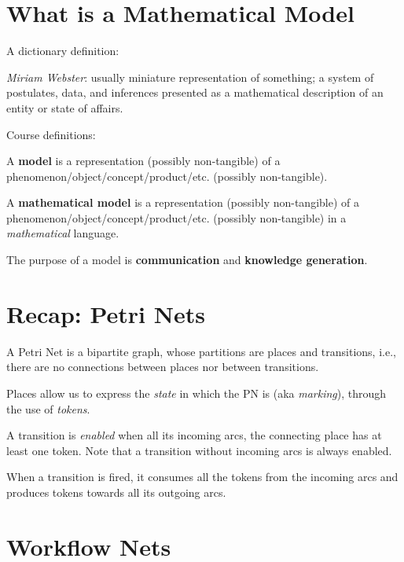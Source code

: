 
\section*{What is a Mathematical Model}

A dictionary definition:

\begin{definition}
	\emph{Miriam Webster}: usually miniature representation of something; a system of postulates, data, and inferences presented as a mathematical description of an entity or state of affairs.
\end{definition}

Course definitions:

\begin{definition}
	A \textbf{model} is a representation (possibly non-tangible) of a phenomenon/object/concept/product/etc. (possibly non-tangible).
\end{definition}

\begin{definition}
	A \textbf{mathematical model} is a representation (possibly non-tangible) of a phenomenon/object/concept/product/etc. (possibly non-tangible) in a \emph{mathematical} language.
\end{definition}

The purpose of a model is \textbf{communication} and \textbf{knowledge generation}.

\section*{Recap: Petri Nets}

A Petri Net is a bipartite graph, whose partitions are places and transitions, i.e., there are no connections between places nor between transitions.

Places allow us to express the \emph{state} in which the PN is (aka \emph{marking}), through the use of \emph{tokens}.

A transition is \emph{enabled} when all its incoming arcs, the connecting place has at least one
token. Note that a transition without incoming arcs is always enabled.

When a transition is fired, it consumes all the tokens from the incoming arcs and produces tokens towards all its outgoing arcs.

\section*{Workflow Nets}


